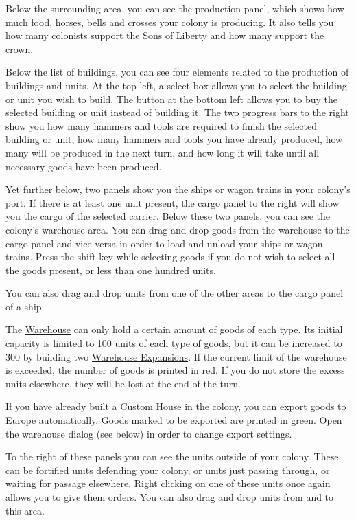 \documentclass[12pt]{article}
\begin{document}
Below the surrounding area, you can see the production panel, which
shows how much food, horses, bells and crosses your colony is
producing. It also tells you how many colonists support the Sons of
Liberty and how many support the crown.

Below the list of buildings, you can see four elements related to
the production of buildings and units. At the top left, a select box
allows you to select the building or unit you wish to build. The
button at the bottom left allows you to buy the selected building or
unit instead of building it. The two progress bars to the right show
you how many hammers and tools are required to finish the selected
building or unit, how many hammers and tools you have already
produced, how many will be produced in the next turn, and how long it
will take until all necessary goods have been produced.

Yet further below, two panels show you the ships or wagon trains in
your colony's port. If there is at least one unit present, the cargo
panel to the right will show you the cargo of the selected
carrier. Below these two panels, you can see the colony's warehouse
area. You can drag and drop goods from the warehouse to the cargo
panel and vice versa in order to load and unload your ships or wagon
trains. Press the shift key while selecting goods if you do not wish
to select all the goods present, or less than one hundred units.

You can also drag and drop units from one of the other areas
to the cargo panel of a ship.

The \hyperlink{Warehouse}{Warehouse} can only hold a certain amount of
goods of each type. Its initial capacity is limited to 100 units of
each type of goods, but it can be increased to 300 by building two
\hyperlink{Warehouse Expansion}{Warehouse Expansions}. If the current
limit of the warehouse is exceeded, the number of goods is printed in
red. If you do not store the excess units elsewhere, they will be lost
at the end of the turn.

If you have already built a \hyperlink{Custom House}{Custom House} in
the colony, you can export goods to Europe automatically. Goods marked
to be exported are printed in green. Open the warehouse dialog (see
below) in order to change export settings.

To the right of these panels you can see the units outside of your
colony. These can be fortified units defending your colony, or units
just passing through, or waiting for passage elsewhere. Right clicking
on one of these units once again allows you to give them orders. You
can also drag and drop units from and to this area.
\end{document}
